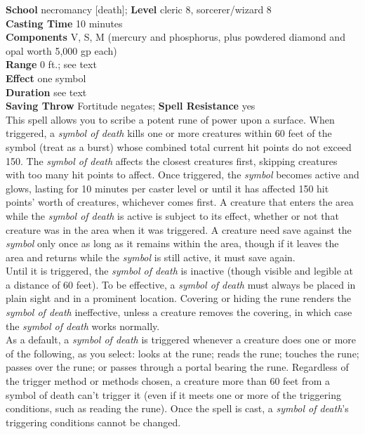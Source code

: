 \textbf{School} necromancy [death]; \textbf{Level} cleric 8, sorcerer/wizard 8\\
\textbf{Casting Time} 10 minutes\\
\textbf{Components} V, S, M (mercury and phosphorus, plus powdered diamond and opal worth 5,000 gp each)\\
\textbf{Range} 0 ft.; see text\\
\textbf{Effect} one symbol\\
\textbf{Duration} see text\\
\textbf{Saving Throw} Fortitude negates; \textbf{Spell Resistance} yes\\
This spell allows you to scribe a potent rune of power upon a surface. When triggered, a \textit{symbol of death }kills one or more creatures within 60 feet of the symbol (treat as a burst) whose combined total current hit points do not exceed 150. The \textit{symbol of death }affects the closest creatures first, skipping creatures with too many hit points to affect. Once triggered, the \textit{symbol }becomes active and glows, lasting for 10 minutes per caster level or until it has affected 150 hit points' worth of creatures, whichever comes first. A creature that enters the area while the \textit{symbol of death }is active is subject to its effect, whether or not that creature was in the area when it was triggered. A creature need save against the \textit{symbol }only once as long as it remains within the area, though if it leaves the area and returns while the \textit{symbol }is still active, it must save again.\\
Until it is triggered, the \textit{symbol of death }is inactive (though visible and legible at a distance of 60 feet). To be effective, a \textit{symbol of death }must always be placed in plain sight and in a prominent location. Covering or hiding the rune renders the \textit{symbol of death }ineffective, unless a creature removes the covering, in which case the \textit{symbol of death }works normally.\\
As a default, a \textit{symbol of death }is triggered whenever a creature does one or more of the following, as you select: looks at the rune; reads the rune; touches the rune; passes over the rune; or passes through a portal bearing the rune. Regardless of the trigger method or methods chosen, a creature more than 60 feet from a symbol of death can't trigger it (even if it meets one or more of the triggering conditions, such as reading the rune). Once the spell is cast, a \textit{symbol of death}'s triggering conditions cannot be changed.\\
